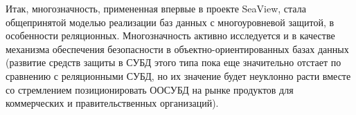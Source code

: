 Итак, многозначность, примененная впервые в проекте SeaView, стала общепринятой моделью реализации баз данных с многоуровневой защитой, в особенности реляционных. Многозначность активно исследуется и в качестве механизма обеспечения безопасности в объектно-ориентированных базах данных (развитие средств защиты в СУБД этого типа пока еще значительно отстает по сравнению с реляционными СУБД, но их значение будет неуклонно расти вместе со стремлением позиционировать ООСУБД на рынке продуктов для коммерческих и правительственных организаций).
